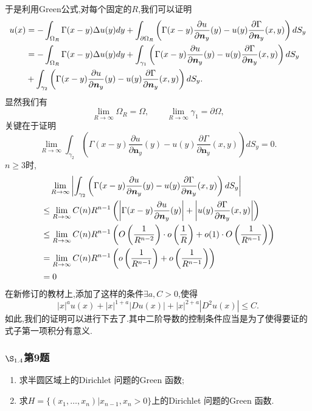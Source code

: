 \documentclass[12pt, a4paper]{ctexart}
\begin{document}
	于是利用Green公式,对每个固定的$R$,我们可以证明
	\begin{align}
		u(x)&= -\int_{\Omega_R} \Gamma(x-y) \Delta u(y) dy + \int_{\partial \Omega_R} \left(\Gamma(x-y) \frac{\partial u}{\partial \bm{n}_y}(y) -u(y)\frac{\partial \Gamma}{\partial \bm{n}_y}(x,y)   \right) dS_y \notag \\
		&=-\int_{\Omega_R} \Gamma(x-y) \Delta u(y) dy + \int_{\gamma_1} \left(\Gamma(x-y) \frac{\partial u}{\partial \bm{n}_y}(y) -u(y)\frac{\partial \Gamma}{\partial \bm{n}_y}(x,y)   \right) dS_y \notag \\
		&+\int_{\gamma_2} \left(\Gamma(x-y) \frac{\partial u}{\partial \bm{n}_y}(y) -u(y)\frac{\partial \Gamma}{\partial \bm{n}_y}(x,y)   \right) dS_y. \notag
	\end{align}
	显然我们有$$
	\lim_{R \to \infty}	\Omega_R = \Omega ,\qquad \lim_{R \to \infty} \gamma_1 = \partial \Omega, $$
	关键在于证明$$
	\lim_{R \to \infty}\int_{\gamma_2} \left(\Gamma(x-y) \frac{\partial u}{\partial \bm{n}_y}(y) -u(y)\frac{\partial \Gamma}{\partial \bm{n}_y}(x,y)   \right) dS_y =0.	$$
	$n \ge 3$时,
	\begin{align}
		&\quad \lim_{R \to \infty} \left|\int_{\gamma_2} \left(\Gamma(x-y) \frac{\partial u}{\partial \bm{n}_y}(y) -u(y)\frac{\partial \Gamma}{\partial \bm{n}_y}(x,y)   \right) dS_y \right| \notag \\
		&\le \lim_{R \to \infty} C(n) R^{n-1} \left( \left| \Gamma(x-y) \frac{\partial u}{\partial \bm{n}_y}(y) \right|+\left|u(y)\frac{\partial \Gamma}{\partial \bm{n}_y}(x,y)   \right| \right) \notag \\
		&\le \lim_{R \to \infty} C(n) R^{n-1} \left( O\left(\frac{1}{R^{n-2}}\right) \cdot o\left(\frac{1}{R}\right) +o(1) \cdot O\left(\frac{1}{R^{n-1}}\right)   \right) \notag \\
		&= \lim_{R \to \infty} C(n) R^{n-1} \left(  o\left(\frac{1}{R^{n-1}}\right) + o\left(\frac{1}{R^{n-1}}\right) \right) \notag \\
		&= 0 \notag
	\end{align}
	{}
	在新修订的教材上,添加了这样的条件$\exists a,C >0$,使得$$
	|x|^a u(x)+|x|^{1+a} |Du(x)| + |x|^{2+a} |D^2 u(x)| \le C.	$$
	如此,我们的证明可以进行下去了.其中二阶导数的控制条件应当是为了使得要证的式子第一项积分有意义.

	\subsubsection{$\S_{1.4}$第9题}
	\kaishu{}
	\begin{enumerate}
		\item 求半圆区域上的Dirichlet 问题的Green 函数;
		\item 求$H = \{(x_1, \dots , x_n)|x_{n−1}, x_n > 0\} $上的Dirichlet 问题的Green 函数.
	\end{enumerate}
	
\end{document}
